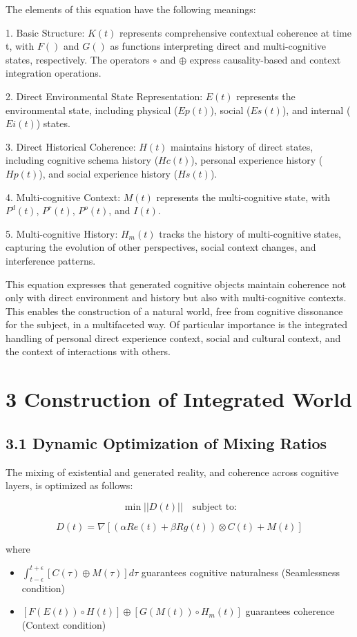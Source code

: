\documentclass{article}
\begin{document}
The elements of this equation have the following meanings:

1. Basic Structure: $K(t)$ represents comprehensive contextual coherence at time t, with $F()$ and $G()$ as functions interpreting direct and multi-cognitive states, respectively. The operators $\circ$ and $\oplus$ express causality-based and context integration operations.

2. Direct Environmental State Representation: $E(t)$ represents the environmental state, including physical ($Ep(t)$), social ($Es(t)$), and internal ($Ei(t)$) states.

3. Direct Historical Coherence: $H(t)$ maintains history of direct states, including cognitive schema history ($Hc(t)$), personal experience history ($Hp(t)$), and social experience history ($Hs(t)$).

4. Multi-cognitive Context: $M(t)$ represents the multi-cognitive state, with $P^d(t)$, $P^r(t)$, $P^o(t)$, and $I(t)$.

5. Multi-cognitive History: $H_m(t)$ tracks the history of multi-cognitive states, capturing the evolution of other perspectives, social context changes, and interference patterns.

This equation expresses that generated cognitive objects maintain coherence not only with direct environment and history but also with multi-cognitive contexts. This enables the construction of a natural world, free from cognitive dissonance for the subject, in a multifaceted way. Of particular importance is the integrated handling of personal direct experience context, social and cultural context, and the context of interactions with others.

\section{3 Construction of Integrated World}

\subsection{3.1 Dynamic Optimization of Mixing Ratios}

The mixing of existential and generated reality, and coherence across cognitive layers, is optimized as follows:

$$
\min ||D(t)|| \quad \text{subject to:}
$$

$$
D(t) = \nabla [(αRe(t) + βRg(t)) \otimes C(t) + M(t)]
$$

where
\begin{itemize}
    \item $\int_{t-\epsilon}^{t+\epsilon} [C(\tau) \oplus M(\tau)] d\tau$ guarantees cognitive naturalness (Seamlessness condition)
    \item $[F(E(t)) \circ H(t)] \oplus [G(M(t)) \circ H_m(t)]$ guarantees coherence (Context condition)
\end{itemize}
\end{document}
